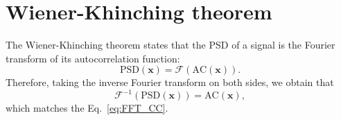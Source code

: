 \section{Wiener-Khinching theorem}
\label{sec:WKT}

The Wiener-Khinching theorem states that the \gls{PSD} of a signal is
the Fourier transform of its autocorrelation function:
\begin{equation}
  \text{PSD}(\mathbf{x}) = \mathcal{F}(\text{AC}(\mathbf{x})).
\end{equation}
Therefore, taking the inverse Fourier transform on both sides, we
obtain that
\begin{equation}
  \mathcal{F}^{-1}(\text{PSD}(\mathbf{x})) = \text{AC}(\mathbf{x}),
\end{equation}
which matches the Eq.~\ref{eq:FFT_CC}.






